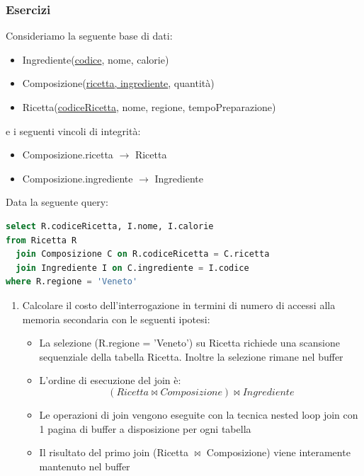 \documentclass[a4paper]{article}
\begin{document}
\subsubsection{Esercizi}
\begin{exercise}
  Consideriamo la seguente base di dati:
  \begin{itemize}
    \item Ingrediente(\underline{codice}, nome, calorie)
    \item Composizione(\underline{ricetta, ingrediente}, quantità)
    \item Ricetta(\underline{codiceRicetta}, nome, regione, tempoPreparazione)
  \end{itemize}
  e i seguenti vincoli di integrità:
  \begin{itemize}
    \item Composizione.ricetta \( \to  \) Ricetta
    \item Composizione.ingrediente \( \to  \) Ingrediente
  \end{itemize}
  Data la seguente query:
\begin{lstlisting}[language=sql]
select R.codiceRicetta, I.nome, I.calorie
from Ricetta R
  join Composizione C on R.codiceRicetta = C.ricetta
  join Ingrediente I on C.ingrediente = I.codice
where R.regione = 'Veneto'
\end{lstlisting}
  \begin{enumerate}
    \item Calcolare il costo dell'interrogazione in termini di numero di
      accessi alla memoria secondaria con le seguenti ipotesi:
      \begin{itemize}
        \item La selezione (R.regione = 'Veneto') su Ricetta richiede una
          scansione sequenziale della tabella Ricetta. Inoltre la 
          selezione rimane nel buffer

        \item L'ordine di esecuzione del join è:
          \[
            ( Ricetta \bowtie Composizione ) \bowtie Ingrediente
          \] 

        \item Le operazioni di join vengono eseguite con la tecnica nested
          loop join con 1 pagina di buffer a disposizione per ogni tabella

        \item Il risultato del primo join (Ricetta \(\bowtie\) Composizione)
          viene interamente mantenuto nel buffer


\end{itemize}
\end{enumerate}
\end{exercise}
\end{document}
